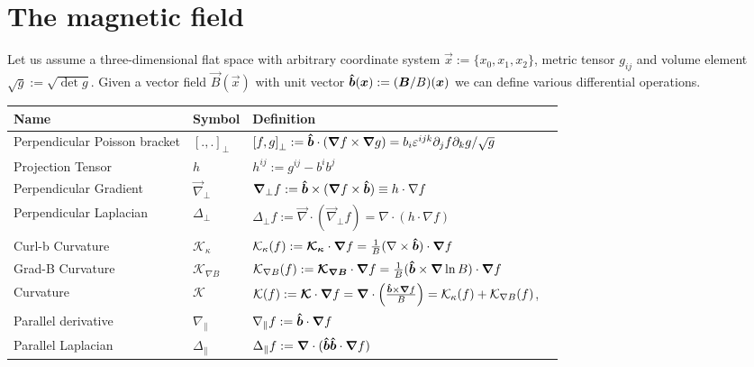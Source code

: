 \section{The magnetic field}\label{sec:magnetic}
Let us assume a three-dimensional flat space with arbitrary coordinate
system $\vec x :=\{x_0, x_1, x_2\}$, metric
tensor $g_{ij}$ and volume element $\sqrt{g} := \sqrt{\det g}$.
Given a vector field $\vec B(\vec x)$ with unit vector $\bm{\hat{b}}({\boldsymbol{x}}) := ({\boldsymbol{B}}/B)({{\boldsymbol{x}}})$
we can define various differential operations.
\begin{longtable}{lll>{\RaggedRight}p{7cm}}
\rowcolor{gray!50}\textbf{Name} &  \textbf{Symbol} & \textbf{Definition} \\
\midrule
    Perpendicular Poisson bracket&
    $\left[.,.\right]_\perp$ &
    $\left[f,g\right]_\perp := \bm{\hat{b}} \cdot \left({\boldsymbol{\nabla}} f \times {\boldsymbol{\nabla}} g\right) =
    b_i \varepsilon^{ijk}\partial_j f\partial_k g/\sqrt{g}$  \\
    Projection Tensor&
    $h $ & $h^{ij} := g^{ij} - b^ib^j $\\
    Perpendicular Gradient&
    $\vec \nabla_\perp $&
    $ {\boldsymbol{\nabla}}_\perp f := \bm{\hat{b}}\times({\boldsymbol{\nabla}} f\times \bm{\hat{b}} ) \equiv
    h \cdot \nabla f$ \\
    Perpendicular Laplacian&
    $\Delta_\perp $&
    $ \Delta_\perp f:= \vec \nabla\cdot (\vec \nabla_\perp f)
    = \nabla\cdot( h\cdot\nabla f)$  \\
    Curl-b Curvature &
    $\mathcal K_\kappa$ &
    $\mathcal K_\kappa(f) := {\boldsymbol{ \mathcal K_\kappa }}\cdot {\boldsymbol{\nabla}} f = \frac{1}{B}(\nabla \times \bm{\hat{b}})\cdot {\boldsymbol{\nabla}} f$ \\
    Grad-B Curvature &
    $\mathcal K_{\nabla B} $ &
    $\mathcal K_{\nabla B}(f) := {\boldsymbol{\mathcal K_{\nabla B}}} \cdot {\boldsymbol{\nabla}} f = \frac{1}{B}(\bm{\hat{b}} \times {\boldsymbol{\nabla}} \ln B)\cdot {\boldsymbol{\nabla}} f$ \\
    Curvature &
    $\mathcal K$ &
    $\mathcal{K}(f):={\boldsymbol{\mathcal K}} \cdot {\boldsymbol{\nabla}} f = {\boldsymbol{\nabla}} \cdot \left(\frac{ \bm{\hat{b}} \times {\boldsymbol{\nabla}} f}{B} \right) = \mathcal K_\kappa(f) + \mathcal K_{\nabla B}(f)$,\\
    Parallel derivative&
    $\nabla_\parallel $&
    $ \nabla_\parallel f := \bm{\hat{b}}\cdot{\boldsymbol{\nabla}} f$ \\
    Parallel Laplacian&
    $\Delta_\parallel $&
    $\Delta_\parallel f:= {\boldsymbol{\nabla}} \cdot ( \bm{\hat{b}}\bm{\hat{b}}\cdot{\boldsymbol{\nabla}} f )$\\
\bottomrule
\end{longtable}
